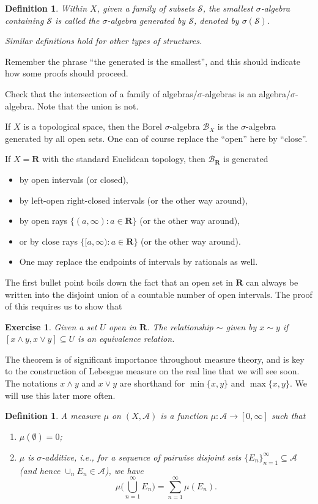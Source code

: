 \documentclass[10pt]{article}
\numberwithin{equation}{section}
\theoremstyle{plain-star}
\theoremstyle{definition-star}
\newtheorem{defn}[equation]{Definition}
\newtheorem{xca}[equation]{Exercise}
\theoremstyle{remark-star}
\theoremstyle{plain-star}
\newcommand{\R}{\mathbf{R}}
\newcommand{\A}{\mathcal{A}}
\newcommand{\B}{\mathcal{B}}
\newcommand{\df}[1]{\textit{#1}}
\begin{document}
\begin{defn}
    Within $X$, given a family of subsets $\mathcal{S}$, the smallest $\sigma$-algebra containing $\mathcal{S}$ is called the \df{$\sigma$-algebra generated by} $\mathcal{S}$, denoted by $\sigma(\mathcal{S})$.

    Similar definitions hold for other types of structures.
\end{defn}
Remember the phrase ``the generated is the smallest'', and this should indicate how some proofs should proceed.

Check that the intersection of a family of algebras/$\sigma$-algebras is an algebra/$\sigma$-algebra. Note that the union is not.

If $X$ is a topological space, then the Borel $\sigma$-algebra $\B_X$ is the $\sigma$-algebra generated by all open sets. One can of course replace the ``open'' here by ``close''.

If $X = \R$ with the standard Euclidean topology, then $\B_\R$ is generated  
\begin{itemize}
    \item by open intervals (or closed), 
    \item by left-open right-closed intervals (or the other way around), 
    \item by open rays $\{(a,\infty):a\in\R\}$ (or the other way around),
    \item or by close rays $\{[a,\infty):a\in\R\}$ (or the other way around).
    \item One may replace the endpoints of intervals by rationals as well.
\end{itemize}

The first bullet point boils down the fact that an open set in $\R$ can always be written into the disjoint union of a countable number of open intervals. The proof of this requires us to show that 

\begin{xca}
    Given a set $U$ open in $\R$. The relationship $\sim$ given by $x \sim y$ if $[x \land y, x \lor y] \subseteq U$ is an equivalence relation.
\end{xca}
The theorem is of significant importance throughout measure theory, and is key to the construction of Lebesgue measure on the real line that we will see soon. The notations $x \land y$ and $x \lor y$ are shorthand for $\min\{x,y\}$ and $\max\{x,y\}$. We will use this later more often.

\begin{defn}
     A \df{measure} $\mu$ on $(X,\A)$ is a function $\mu\colon\A\to[0,\infty]$ such that \begin{enumerate}
         \item $\mu(\emptyset) = 0$;
         \item $\mu$ is \df{$\sigma$-additive}, i.e., for a sequence of pairwise disjoint sets $\{E_n\}_{n=1}^\infty \subseteq \A$ (and hence $\cup_n E_n \in \A$), we have  \[
            \mu\biggl(\bigcup_{n=1}^\infty E_n\biggr) = \sum_{n=1}^\infty \mu(E_n).
         \]
     \end{enumerate}
\end{defn}
\end{document}
